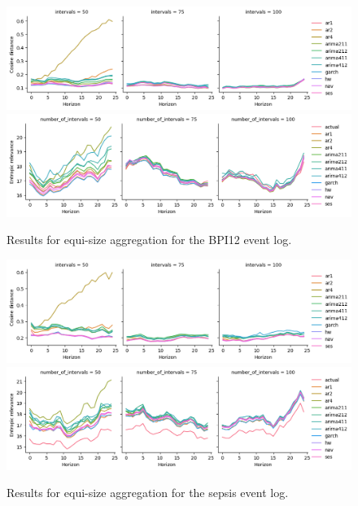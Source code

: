 \begin{figure}
    \centering
    \includegraphics[width=\textwidth]{img/bpi12_cosine_equisize.png}
    \includegraphics[width=\textwidth]{img/bpi12_entropic_equisize.png}
    \caption{Results for equi-size aggregation for the BPI12 event log.}
    \label{fig:bpi12_equisize}
\end{figure}

\begin{figure}
    \centering
    \includegraphics[width=\textwidth]{img/sepsis_cosine_equisize.png}
    \includegraphics[width=\textwidth]{img/sepsis_entropic_equisize.png}
    \caption{Results for equi-size aggregation for the sepsis event log.}
    \label{fig:sepsis_equisize}
\end{figure}

